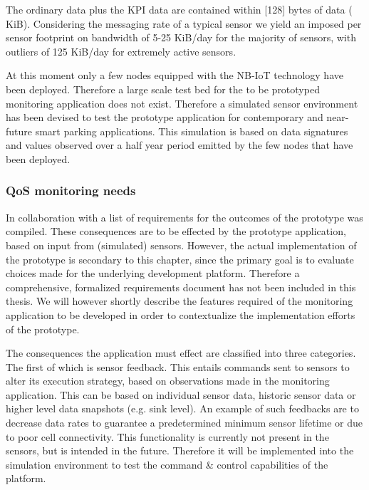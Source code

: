 The ordinary data plus the \ublox KPI data are contained within [128] bytes of data ( KiB). Considering the messaging rate of a typical sensor we yield an imposed per sensor footprint on bandwidth of 5-25 KiB/day for the majority of sensors, with outliers of 125 KiB/day for extremely active sensors.

At this moment only a few nodes equipped with the NB-IoT technology have been deployed. Therefore a large scale test bed for the to be prototyped monitoring application does not exist. Therefore a simulated sensor environment has been devised to test the prototype application for contemporary and near-future smart parking applications. This simulation is based on data signatures and values observed over a half year period emitted by the few nodes that have been deployed.

\subsubsection{QoS monitoring needs}
In collaboration with \idsystems a list of requirements for the outcomes of the prototype was compiled. These consequences are to be effected by the prototype application, based on input from (simulated) sensors. However, the actual implementation of the prototype is secondary to this chapter, since the primary goal is to evaluate choices made for the underlying development platform. Therefore a comprehensive, formalized requirements document has not been included in this thesis. We will however shortly describe the features required of the monitoring application to be developed in order to contextualize the implementation efforts of the prototype.

The consequences the application must effect are classified into three categories. The first of which is sensor feedback. This entails commands sent to sensors to alter its execution strategy, based on observations made in the monitoring application. This can be based on individual sensor data, historic sensor data or higher level data snapshots (e.g. sink level). An example of such feedbacks are to decrease data rates to guarantee a predetermined minimum sensor lifetime or due to poor cell connectivity. This functionality is currently not present in the \nedap sensors, but is intended in the future. Therefore it will be implemented into the simulation environment to test the command \& control capabilities of the platform.

